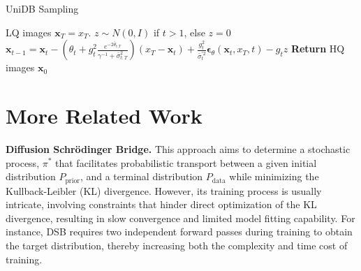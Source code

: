 \begin{algorithm}[h]
   \caption{UniDB Sampling}
   \label{sampling}
\begin{algorithmic}
     LQ images $\mathbf{x}_T = x_T$.
        \STATE $ z \sim N(0, I)$ if $t > 1$, else $z = 0$  
        \STATE $\mathbf{x}_{t-1} = \mathbf{x}_{t} - \left( \theta_t + g^2_t \frac{e^{-2\bar{\theta}_{t:T}}}{\gamma^{-1} + \bar{\sigma}^2_{t:T}}\right) (x_T - \mathbf{x}_t) + \frac{g^2_t}{\bar{\sigma}_{t}^{\prime 2}} \boldsymbol{\epsilon}_{\theta}(\mathbf{x}_t, x_T, t) - g_t z $
   \ENDFOR
   \STATE \textbf{Return} HQ images $\mathbf{x}_0$
\end{algorithmic}
\end{algorithm}




\section{More Related Work}\label{more_related_work}
\textbf{Diffusion Schrödinger Bridge.} This approach aims to determine a stochastic process, $\pi^*$ that facilitates probabilistic transport between a given initial distribution $P_{\text{prior}}$, and a terminal distribution $P_{\text{data}}$ \cite{I2SB, shi2023diffusionschrodingerbridgematching,debortoli2023diffusionschrodingerbridgeapplications} while minimizing the Kullback-Leibler (KL) divergence. However, its training process is usually intricate, involving constraints that hinder direct optimization of the KL divergence, resulting in slow convergence and limited model fitting capability. For instance, DSB \cite{somnath2024aligneddiffusionschrodingerbridges} requires two independent forward passes during training to obtain the target distribution, thereby increasing both the complexity and time cost of training.





\newpage


